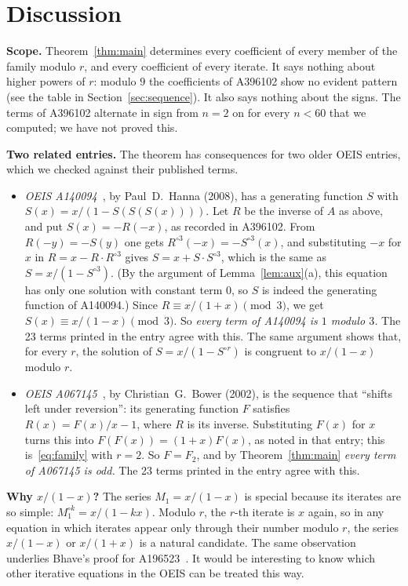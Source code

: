 \documentclass[11pt,a4paper]{article}
\theoremstyle{definition}
\theoremstyle{remark}
\newcommand{\para}[1]{\par\medskip\noindent\textbf{#1}\enspace}
\begin{document}
\section{Discussion}\label{sec:discussion}

\para{Scope.} Theorem~\ref{thm:main} determines every coefficient of every member of the family modulo $r$, and every
coefficient of every iterate. It says nothing about higher powers of $r$: modulo $9$ the coefficients of A396102 show no
evident pattern (see the table in Section~\ref{sec:sequence}). It also says nothing about the signs. The terms of
A396102 alternate in sign from $n=2$ on for every $n<60$ that we computed; we have not proved this.

\para{Two related entries.} The theorem has consequences for two older OEIS entries, which we checked against their
published terms.
\begin{itemize}
\item \emph{OEIS A140094}~\cite{oeisR}, by Paul~D.~Hanna (2008), has a generating function $S$ with
$S(x)=x/(1-S(S(S(x))))$. Let $R$ be the inverse of $A$ as above, and put $S(x)=-R(-x)$, as recorded in A396102. From
$R(-y)=-S(y)$ one gets $R^{\circ 3}(-x)=-S^{\circ3}(x)$, and substituting $-x$ for $x$ in $R=x-R\cdot R^{\circ3}$ gives
$S=x+S\cdot S^{\circ3}$, which is the same as $S=x/(1-S^{\circ3})$. (By the argument of Lemma~\ref{lem:aux}(a), this
equation has only one solution with constant term $0$, so $S$ is indeed the generating function of A140094.) Since $R\equiv x/(1+x)\pmod3$, we get
$S(x)\equiv x/(1-x)\pmod3$. So \emph{every term of A140094 is $1$ modulo $3$.} The 23 terms printed in the entry
agree with this. The same argument shows that, for every $r$, the solution of $S=x/(1-S^{\circ r})$ is congruent to
$x/(1-x)$ modulo $r$.
\item \emph{OEIS A067145}~\cite{oeisF2}, by Christian~G.~Bower (2002), is the sequence that ``shifts left under
reversion'': its generating function $F$ satisfies $R(x)=F(x)/x-1$, where $R$ is its inverse. Substituting $F(x)$ for
$x$ turns this into $F(F(x))=(1+x)F(x)$, as noted in that entry; this is~\eqref{eq:family} with $r=2$. So $F=F_2$,
and by Theorem~\ref{thm:main} \emph{every term of A067145 is odd.} The 23 terms printed in the entry agree with this.
\end{itemize}

\para{Why $x/(1-x)$?} The series $M_1=x/(1-x)$ is special because its iterates are so simple: $M_1^{\circ k}=x/(1-kx)$.
Modulo $r$, the $r$-th iterate is $x$ again, so in any equation in which iterates appear only through their number
modulo $r$, the series $x/(1-x)$ or $x/(1+x)$ is a natural candidate. The same observation underlies Bhave's proof
for A196523~\cite{oeisB}. It would be interesting to know which other iterative equations in the OEIS can be treated
this way.
\end{document}
